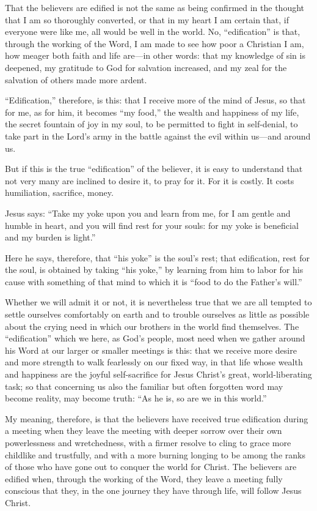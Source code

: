 That the believers are edified is not the same as being confirmed in the thought that I am so thoroughly converted, or that in my heart I am certain that, if everyone were like me, all would be well in the world. No, “edification” is that, through the working of the Word, I am made to see how poor a Christian I am, how meager both faith and life are—in other words: that my knowledge of sin is deepened, my gratitude to God for salvation increased, and my zeal for the salvation of others made more ardent.

“Edification,” therefore, is this: that I receive more of the mind of Jesus, so that for me, as for him, it becomes “my food,” the wealth and happiness of my life, the secret fountain of joy in my soul, to be permitted to fight in self-denial, to take part in the Lord’s army in the battle against the evil within us—and around us.

But if this is the true “edification” of the believer, it is easy to understand that not very many are inclined to desire it, to pray for it. For it is costly. It costs humiliation, sacrifice, money.

Jesus says: “Take my yoke upon you and learn from me, for I am gentle and humble in heart, and you will find rest for your souls: for my yoke is beneficial and my burden is light.”

Here he says, therefore, that “his yoke” is the soul’s rest; that edification, rest for the soul, is obtained by taking “his yoke,” by learning from him to labor for his cause with something of that mind to which it is “food to do the Father’s will.”

Whether we will admit it or not, it is nevertheless true that we are all tempted to settle ourselves comfortably on earth and to trouble ourselves as little as possible about the crying need in which our brothers in the world find themselves. The “edification” which we here, as God’s people, most need when we gather around his Word at our larger or smaller meetings is this: that we receive more desire and more strength to walk fearlessly on our fixed way, in that life whose wealth and happiness are the joyful self-sacrifice for Jesus Christ’s great, world-liberating task; so that concerning us also the familiar but often forgotten word may become reality, may become truth: “As he is, so are we in this world.”

My meaning, therefore, is that the believers have received true edification during a meeting when they leave the meeting with deeper sorrow over their own powerlessness and wretchedness, with a firmer resolve to cling to grace more childlike and trustfully, and with a more burning longing to be among the ranks of those who have gone out to conquer the world for Christ. The believers are edified when, through the working of the Word, they leave a meeting fully conscious that they, in the one journey they have through life, will follow Jesus Christ.

